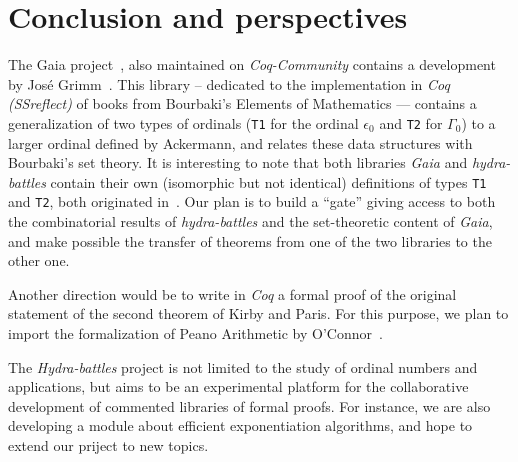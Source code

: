 \documentclass{easychair}
\begin{document}
\section{Conclusion and perspectives}






The Gaia project~\cite{Gaia}, also maintained on \textit{Coq-Community} contains a development by José Grimm~\cite{grimm:hal-00911710}. This library -- dedicated  to the implementation in \textit{Coq (SSreflect)} of books from  Bourbaki's Elements of Mathematics --- contains a generalization of two types of ordinals (\texttt{T1} for the ordinal $\epsilon_0$ and
\texttt{T2} for $\Gamma_0$) to a larger ordinal defined by Ackermann, and relates these data structures with Bourbaki's set theory.
It is interesting to note that both libraries \textit{Gaia} and \textit{hydra-battles} contain their own (isomorphic but not identical) definitions of types \texttt{T1} and \texttt{T2}, both originated in~\cite{CantorContrib}.
Our plan is to build a  ``gate'' giving access to both the combinatorial results of \textit{hydra-battles} and the set-theoretic content of \textit{Gaia}, and make possible the transfer of theorems from one of the two libraries to the other one.

Another direction would be to write in \textit{Coq} a formal proof of the original statement of the second theorem of Kirby and Paris. For this purpose, we plan to import  the formalization of Peano Arithmetic by O'Connor~\cite{Goedel}.

The \emph{Hydra-battles} project is not limited to the study of ordinal numbers and applications, but aims to be an experimental platform for the collaborative development of commented libraries of formal proofs. For instance, we are also developing 
a module about efficient exponentiation algorithms, and hope
to extend our priject to new topics.




\label{sect:bib}

%
%
%

\end{document}
